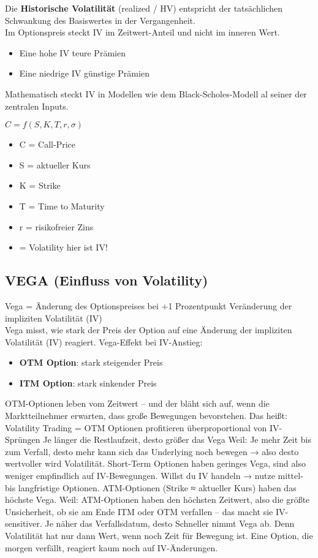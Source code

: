 Die \textbf{Historische Volatilität} (realized / HV) entspricht der tatsächlichen Schwankung des Basiswertes in der Vergangenheit.
\\
Im Optionspreis steckt IV im Zeitwert-Anteil und nicht im inneren Wert. 
\begin{itemize}
  \item Eine hohe IV \rightarrow teure Prämien
  \item Eine niedrige IV \rightarrow günstige Prämien
\end{itemize}
Mathematisch steckt IV in Modellen wie dem Black-Scholes-Modell al seiner der zentralen Inputs.

$C=f(S,K,T,r,σ)$

\begin{itemize}
  \item C = Call-Price
  \item S = aktueller Kurs
  \item K = Strike
  \item T = Time to Maturity
  \item r = risikofreier Zins
  \item \sigma = Volatility \rightarrow hier ist IV!
\end{itemize}

\subsection{VEGA (Einfluss von Volatility)}
Vega = Änderung des Optionspreises bei +1 Prozentpunkt Veränderung der impliziten Volatilität (IV) \\
Vega misst, wie stark der Preis der Option auf eine Änderung der impliziten Volatilität (IV) reagiert.
Vega-Effekt bei IV-Anstieg:
\begin{itemize}
  \item \textbf{OTM Option}: stark steigender Preis
  \item \textbf{ITM Option}: stark sinkender Preis
\end{itemize}
OTM-Optionen leben vom Zeitwert – und der bläht sich auf, wenn die Marktteilnehmer erwarten, dass große Bewegungen bevorstehen.
Das heißt: Volatility Trading = OTM Optionen profitieren überproportional von IV-Sprüngen
Je länger die Restlaufzeit, desto größer das Vega
Weil: Je mehr Zeit bis zum Verfall, desto mehr kann sich das Underlying noch bewegen → also desto wertvoller wird Volatilität.
Short-Term Optionen haben geringes Vega, sind also weniger empfindlich auf IV-Bewegungen.
Willst du IV handeln → nutze mittel- bis langfristige Optionen.
ATM-Optionen (Strike ≈ aktueller Kurs) haben das höchste Vega. Weil: ATM-Optionen haben den höchsten Zeitwert, also die größte Unsicherheit, ob sie am Ende ITM oder OTM verfallen – das macht sie IV-sensitiver.
Je näher das Verfallsdatum, desto Schneller nimmt Vega ab. Denn Volatilität hat nur dann Wert, wenn noch Zeit für Bewegung ist. Eine Option, die morgen verfällt, reagiert kaum noch auf IV-Änderungen.

